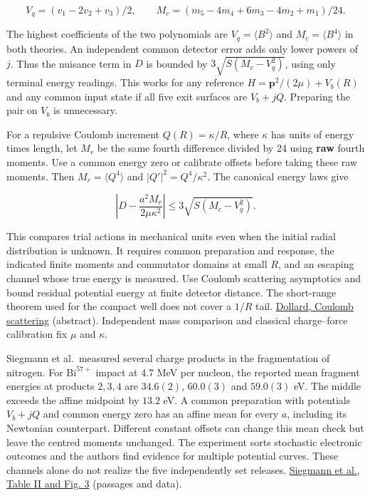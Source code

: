 \documentclass[11pt,a4paper]{article}
\begin{document}
\[
 V_q=(v_1-2v_2+v_3)/2,\qquad
 M_c=(m_5-4m_4+6m_3-4m_2+m_1)/24.
\]

The highest coefficients of the two polynomials are
\(V_q=\langle B^2\rangle\) and \(M_c=\langle B^4\rangle\) in both
theories. An independent common detector error adds only lower powers of
\(j\). Thus the nuisance term in \(D\) is bounded by
\(3\sqrt{S(M_c-V_q^2)}\), using only terminal energy readings. This
works for any reference \(H=\mathbf p^2/(2\mu)+V_b(R)\) and any common
input state if all five exit surfaces are \(V_b+jQ\). Preparing the pair
on \(V_b\) is unnecessary.

For a repulsive Coulomb increment \(Q(R)=\kappa/R\), where \(\kappa\)
has units of energy times length, let \(M_r\) be the same fourth
difference divided by 24 using \textbf{raw} fourth moments. Use a common
energy zero or calibrate offsets before taking these raw moments. Then
\(M_r=\langle Q^4\rangle\) and \(|Q'|^2=Q^4/\kappa^2\). The canonical
energy laws give

\[
 \left|D-\frac{a^2 M_r}{2\mu\kappa^2}\right|
           \le 3\sqrt{S(M_c-V_q^2)}.
\]

This compares trial actions in mechanical units even when the initial
radial distribution is unknown. It requires common preparation and
response, the indicated finite moments and commutator domains at small
\(R\), and an escaping channel whose true energy is measured. Use
Coulomb scattering asymptotics and bound residual potential energy at
finite detector distance. The short-range theorem used for the compact
well does not cover a \(1/R\) tail.
\href{https://doi.org/10.1063/1.1704171}{Dollard, Coulomb scattering}
(abstract). Independent mass comparison and classical charge--force
calibration fix \(\mu\) and \(\kappa\).

Siegmann et al.~measured several charge products in the fragmentation of
nitrogen. For \(\mathrm{Bi}^{57+}\) impact at 4.7 MeV per nucleon, the
reported mean fragment energies at products \(2,3,4\) are \(34.6(2)\),
\(60.0(3)\) and \(59.0(3)\) eV. The middle exceeds the affine midpoint
by \(13.2\) eV. A common preparation with potentials \(V_b+jQ\) and
common energy zero has an affine mean for every \(a\), including its
Newtonian counterpart. Different constant offsets can change this mean
check but leave the centred moments unchanged. The experiment sorts
stochastic electronic outcomes and the authors find evidence for
multiple potential curves. These channels alone do not realize the five
independently set releases.
\href{https://doi.org/10.1103/PhysRevA.62.022718}{Siegmann et al., Table
II and Fig. 3} (passages and data).
\end{document}
